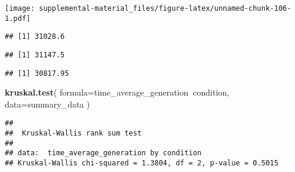 \documentclass[]{book}
\newenvironment{Shaded}{\begin{snugshade}}{\end{snugshade}}
\newcommand{\DataTypeTok}[1]{\textcolor[rgb]{0.13,0.29,0.53}{#1}}
\newcommand{\KeywordTok}[1]{\textcolor[rgb]{0.13,0.29,0.53}{\textbf{#1}}}
\newcommand{\NormalTok}[1]{#1}
\newcommand{\OperatorTok}[1]{\textcolor[rgb]{0.81,0.36,0.00}{\textbf{#1}}}
\newcommand{\StringTok}[1]{\textcolor[rgb]{0.31,0.60,0.02}{#1}}
\begin{document}
\texttt{[image: supplemental-material\_files/figure-latex/unnamed-chunk-106-1.pdf]}

\begin{Shaded}
\end{Shaded}

\begin{verbatim}
## [1] 31028.6
\end{verbatim}

\begin{Shaded}
\end{Shaded}

\begin{verbatim}
## [1] 31147.5
\end{verbatim}

\begin{Shaded}
\end{Shaded}

\begin{verbatim}
## [1] 30817.95
\end{verbatim}

\begin{Shaded}
\begin{Highlighting}[]
\KeywordTok{kruskal.test}\NormalTok{(}
  \DataTypeTok{formula=}\NormalTok{time_average_generation}\OperatorTok{~}\NormalTok{condition,}
  \DataTypeTok{data=}\NormalTok{summary_data}
\NormalTok{)}
\end{Highlighting}
\end{Shaded}

\begin{verbatim}
## 
##  Kruskal-Wallis rank sum test
## 
## data:  time_average_generation by condition
## Kruskal-Wallis chi-squared = 1.3804, df = 2, p-value = 0.5015
\end{verbatim}
\end{document}
